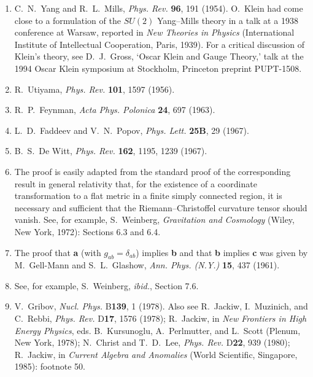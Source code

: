 \begin{enumerate}
  \item {}\label{ch15-ref-1}
  C.~N.~Yang and R.~L.~Mills, \textit{Phys. Rev.} \textbf{96}, 191 (1954). O.~Klein had come close to a formulation of the $SU(2)$ Yang--Mills theory in a talk at a 1938 conference at Warsaw, reported in \textit{New Theories in Physics} (International Institute of Intellectual Cooperation, Paris, 1939). For a critical discussion of Klein's theory, see D.~J.~Gross, `Oscar Klein and Gauge Theory,' talk at the 1994 Oscar Klein symposium at Stockholm, Princeton preprint PUPT-1508.

  \item {}\label{ch15-ref-2}
  R.~Utiyama, \textit{Phys. Rev.} \textbf{101}, 1597 (1956).

  \item {}\label{ch15-ref-3}
  R.~P.~Feynman, \textit{Acta Phys. Polonica} \textbf{24}, 697 (1963).

  \item {}\label{ch15-ref-4}
  L.~D.~Faddeev and V.~N.~Popov, \textit{Phys. Lett.} \textbf{25B}, 29 (1967).

  \item {}\label{ch15-ref-5}
  B.~S.~De Witt, \textit{Phys. Rev.} \textbf{162}, 1195, 1239 (1967).

  \item {}\label{ch15-ref-6}
  The proof is easily adapted from the standard proof of the corresponding result in general relativity that, for the existence of a coordinate transformation to a flat metric in a finite simply connected region, it is necessary and sufficient that the Riemann--Christoffel curvature tensor should vanish. See, for example, S.~Weinberg, \textit{Gravitation and Cosmology} (Wiley, New York, 1972): Sections 6.3 and 6.4.

  \item {}\label{ch15-ref-7}
  The proof that \textbf{a} (with $g_{ab}=\delta_{ab}$) implies \textbf{b} and that \textbf{b} implies \textbf{c} was given by M.~Gell-Mann and S.~L.~Glashow, \textit{Ann. Phys. (N.Y.)} \textbf{15}, 437 (1961).

  \item {}\label{ch15-ref-8}
  See, for example, S.~Weinberg, \textit{ibid.}, Section 7.6.

  \item {}\label{ch15-ref-9}
  V.~Gribov, \textit{Nucl. Phys.} B\textbf{139}, 1 (1978). Also see R.~Jackiw, I.~Muzinich, and C.~Rebbi, \textit{Phys. Rev.} D\textbf{17}, 1576 (1978); R.~Jackiw, in \textit{New Frontiers in High Energy Physics}, eds. B.~Kursunoglu, A.~Perlmutter, and L.~Scott (Plenum, New York, 1978); N.~Christ and T.~D.~Lee, \textit{Phys. Rev.} D\textbf{22}, 939 (1980); R.~Jackiw, in \textit{Current Algebra and Anomalies} (World Scientific, Singapore, 1985): footnote 50.


\end{enumerate}
